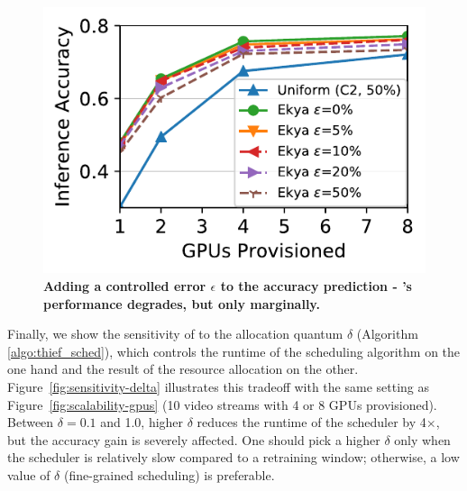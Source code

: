 \begin{figure}
	\includegraphics[width=\linewidth]{results/sensitivity/sensitivity_profileerrors_cityscapes.pdf}
	\caption{\bf Adding a controlled error $\epsilon$ to the accuracy prediction -  \name{}'s performance degrades, but only marginally.}
	\label{fig:sensitivity-accuracy-error}
\end{figure}


 
Finally, we show the sensitivity of \name to the allocation quantum $\delta$ (Algorithm \ref{algo:thief_sched}), which controls the runtime of the scheduling algorithm on the one hand and the result of the resource allocation on the other.
Figure~\ref{fig:sensitivity-delta} illustrates this tradeoff with the same setting as Figure~\ref{fig:scalability-gpus} (10 video streams with 4 or 8 GPUs provisioned).
Between $\delta=0.1$ and 1.0, higher $\delta$ reduces the runtime of the scheduler by 4$\times$, but the accuracy gain is severely affected. 
One should pick a higher $\delta$ only when the scheduler is relatively slow compared to a retraining window; otherwise, a low value of $\delta$ (fine-grained scheduling) is preferable.

